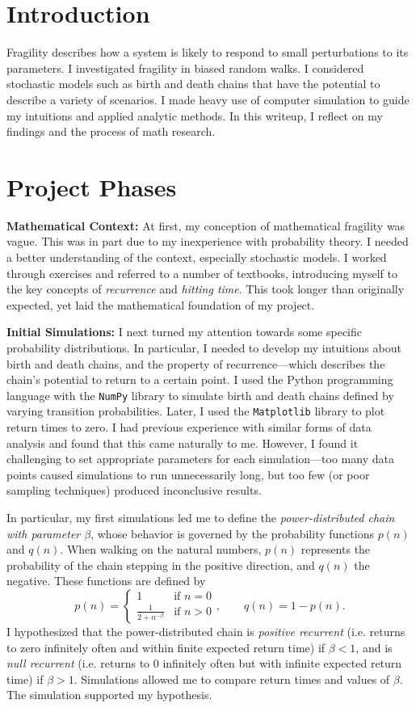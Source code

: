 \documentclass[12pt,letterpaper]{article}
\begin{document}
\section*{Introduction}
Fragility describes how a system is likely to respond to small perturbations to its parameters.
I investigated fragility in biased random walks. I considered stochastic models such as birth
and death chains that have the potential to describe a variety of scenarios. I made heavy use of
computer simulation to guide my intuitions and applied analytic methods. In this writeup, I reflect
on my findings and the process of math research.


\section*{Project Phases}
\noindent
\textbf{Mathematical Context:} At first, my conception of mathematical fragility was vague. This was in
part due to my inexperience with probability theory. I needed a better understanding of the context,
especially stochastic models. I worked through exercises and referred to a number of textbooks,
introducing myself to the key concepts of \emph{recurrence} and \emph{hitting time}. This took longer
than originally expected, yet laid the mathematical foundation of my project.

\noindent
\textbf{Initial Simulations:} I next turned my attention towards some specific probability
distributions. In particular, I needed to develop my intuitions about birth and death chains, and the
property of recurrence---which describes the chain's potential to return to a certain point. I used the
Python programming language with the \texttt{NumPy} library to simulate birth and death chains defined
by varying transition probabilities. Later, I used the \texttt{Matplotlib} library to plot return times
to zero. I had previous experience with similar forms of data analysis and found that this came
naturally to me.  However, I found it challenging to set appropriate parameters for each
simulation---too many data points caused simulations to run unnecessarily long, but too few (or poor
sampling techniques) produced inconclusive results.

In particular, my first simulations led me to define the \emph{power-distributed chain with parameter
$\beta$}, whose behavior is governed by the probability functions $p(n)$ and $q(n)$. When walking on the
natural numbers, $p(n)$ represents the probability of the chain stepping in the positive direction, and
$q(n)$ the negative. These functions are defined by
\[
    p(n) = \begin{cases}
        1 & \text{if } n = 0 \\
        \frac{1}{2+n^{-\beta}} & \text{if } n > 0
    \end{cases}, \quad \quad
    q(n) = 1-p(n).
\]
I hypothesized that the power-distributed chain is \emph{positive recurrent} (i.e. returns to zero
infinitely often and within finite expected return time) if $\beta < 1$, and is \emph{null recurrent}
(i.e.  returns to $0$ infinitely often but with infinite expected return time) if $\beta > 1$.
Simulations allowed me to compare return times and values of $\beta$. The simulation supported my
hypothesis.
\end{document}
